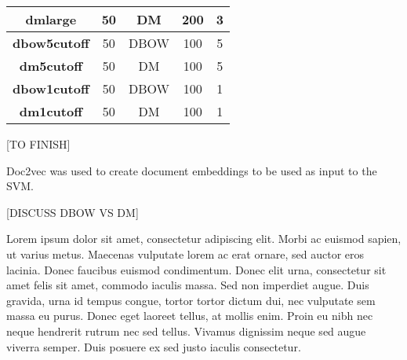 \documentclass[twocolumn]{article}
\begin{document}
\begin{table*}[]
\begin{tabular}{|c|c|c|c|c|}
\textbf{dmlarge}     & 50                                                                 & DM                                                          & 200                                                                    & 3                                                                   \\ \hline
\textbf{dbow5cutoff} & 50                                                                 & DBOW                                                        & 100                                                                    & 5                                                                   \\ \hline
\textbf{dm5cutoff}   & 50                                                                 & DM                                                          & 100                                                                    & 5                                                                   \\ \hline
\textbf{dbow1cutoff} & 50                                                                 & DBOW                                                        & 100                                                                    & 1                                                                   \\ \hline
\textbf{dm1cutoff}   & 50                                                                 & DM                                                          & 100                                                                    & 1                                                                   \\ \hline
\end{tabular}
\end{table*}

[TO FINISH]

Doc2vec \cite{doc2vec} was used to create document embeddings to be used as input to the SVM. 

[DISCUSS DBOW VS DM]

Lorem ipsum dolor sit amet, consectetur adipiscing elit. Morbi ac euismod sapien, ut varius metus. Maecenas vulputate lorem ac erat ornare, sed auctor eros lacinia. Donec faucibus euismod condimentum. Donec elit urna, consectetur sit amet felis sit amet, commodo iaculis massa. Sed non imperdiet augue. Duis gravida, urna id tempus congue, tortor tortor dictum dui, nec vulputate sem massa eu purus. Donec eget laoreet tellus, at mollis enim. Proin eu nibh nec neque hendrerit rutrum nec sed tellus. Vivamus dignissim neque sed augue viverra semper. Duis posuere ex sed justo iaculis consectetur.
\end{document}

